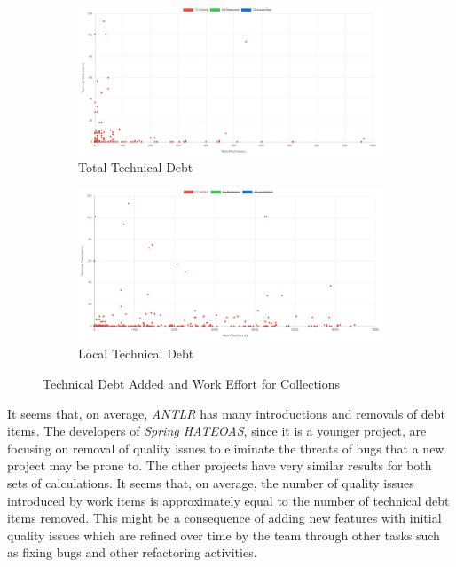 \documentclass{mpaper}
\begin{document}
\begin{figure}
	\centering
	\begin{subfigure}{.45\textwidth}
		\includegraphics[width=\linewidth]{images/collections_added_debt_commit.png}
		\caption{Total Technical Debt}
		\label{fig:td-added-commit}
	\end{subfigure}
	\begin{subfigure}{.45\textwidth}
		\includegraphics[width=\linewidth]{images/collections_added_debt_ticket.png}
		\caption{Local Technical Debt}
		\label{fig:td-added-ticket}
	\end{subfigure}
	\caption{Technical Debt Added and Work Effort for Collections}
	\label{fig:td-added}
\end{figure}


It seems that, on average, \emph{ANTLR} has many introductions and removals of
debt items. The developers of \emph{Spring HATEOAS}, since it is a younger
project, are focusing on removal of quality issues to eliminate the threats of
bugs that a new project may be prone to. The other projects have very similar
results for both sets of calculations. It seems that, on average, the number of
quality issues introduced by work items is approximately equal to the number of
technical debt items removed. This might be a consequence of adding new features
with initial quality issues which are refined over time by the team through
other tasks such as fixing bugs and other refactoring activities.
\end{document}
